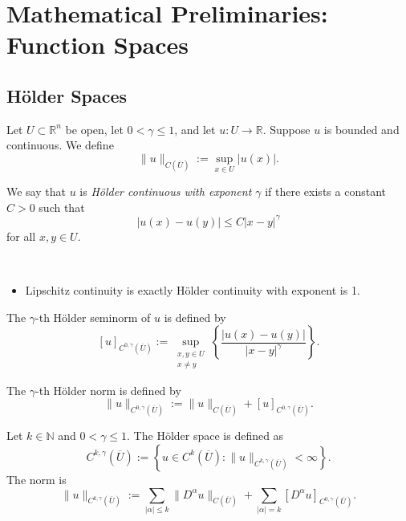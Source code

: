 \chapter{Mathematical Preliminaries: Function Spaces}

\section{Hölder Spaces}

\begin{definition}
Let $U\subset \mathbb{R}^n$ be open, let $0<\gamma\le 1$, and let
$
u:U\to \mathbb{R}.
$
Suppose $u$ is bounded and continuous. We define
$$
\|u\|_{C(\overline{U})}
:=
\sup_{x\in U}|u(x)|.
$$
\end{definition}

\begin{definition}
We say that $u$ is \emph{Hölder continuous with exponent $\gamma$} if there exists a constant $C>0$ such that
$$
|u(x)-u(y)|
\le
C|x-y|^\gamma
$$
for all $x,y\in U$.
\end{definition}
\begin{remark}\
    \begin{itemize}
        \item Lipschitz continuity is exactly Hölder continuity with exponent is 1.
    \end{itemize}
\end{remark}

\begin{definition}
The $\gamma$-th Hölder seminorm of $u$ is defined by
$$
[u]_{C^{0,\gamma}(\overline{U})}
:=
\sup_{\substack{x,y\in U\\ x\neq y}}
\left\{
\frac{|u(x)-u(y)|}{|x-y|^\gamma}
\right\}.
$$

The $\gamma$-th Hölder norm is defined by
$$
\|u\|_{C^{0,\gamma}(\overline{U})}
:=
\|u\|_{C(\overline{U})}
+
[u]_{C^{0,\gamma}(\overline{U})}.
$$
\end{definition}

\begin{definition}
Let $k\in \mathbb{N}$ and $0<\gamma\le 1$. The Hölder space is defined as
$$
C^{k,\gamma}(\overline{U})
:=
\left\{
u\in C^k(\overline{U}):
\|u\|_{C^{k,\gamma}(\overline{U})}<\infty
\right\}.
$$
The norm is
$$
\|u\|_{C^{k,\gamma}(\overline{U})}
:=
\sum_{|\alpha|\le k}
\|D^\alpha u\|_{C(\overline{U})}
+
\sum_{|\alpha|=k}
[D^\alpha u]_{C^{0,\gamma}(\overline{U})}.
$$
\end{definition}

